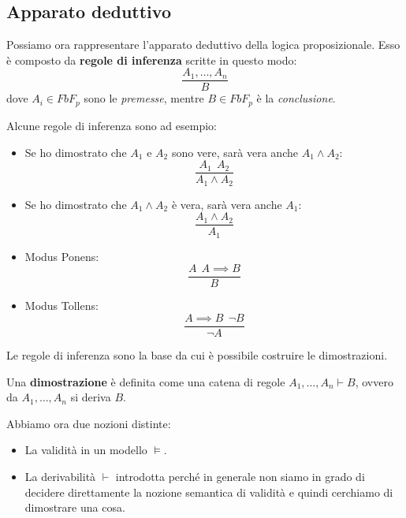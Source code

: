 \subsection{Apparato deduttivo}
Possiamo ora rappresentare l'apparato deduttivo della logica proposizionale. Esso
è composto da \textbf{regole di inferenza} scritte in questo modo:
\begin{equation}
    \frac{A_1, \dots, A_n}{B}
\end{equation}
dove $A_i \in FbF_p$ sono le \textit{premesse}, mentre $B \in FbF_p$ è la
\textit{conclusione}.

Alcune regole di inferenza sono ad esempio:
\begin{itemize}
    \item Se ho dimostrato che $A_1$ e $A_2$ sono vere, sarà vera anche $A_1
              \land A_2$:
          \begin{equation}
              \frac{A_1 \ \ A_2}{A_1 \land A_2}
          \end{equation}
    \item Se ho dimostrato che $A_1 \land A_2$ è vera, sarà vera anche $A_1$:
          \begin{equation}
              \frac{A_1 \land A_2}{A_1}
          \end{equation}
    \item Modus Ponens:
          \begin{equation}
              \frac{A \ \ A \implies B}{B}
          \end{equation}
    \item Modus Tollens:
          \begin{equation}
              \frac{A \implies B \ \ \lnot B}{\lnot A}
          \end{equation}
\end{itemize}
Le regole di inferenza sono la base da cui è possibile costruire le dimostrazioni.
\begin{definizione}
    Una \textbf{dimostrazione} è definita come una catena di regole $A_1, \dots,
        A_n \vdash B$, ovvero da $A_1, \dots, A_n$ si deriva $B$.
\end{definizione}
Abbiamo ora due nozioni distinte:
\begin{itemize}
    \item La validità in un modello $\models$.
    \item La derivabilità $\vdash$ introdotta perché in generale non siamo in
          grado di decidere direttamente la nozione semantica di validità e
          quindi cerchiamo di dimostrare una cosa.
\end{itemize}
